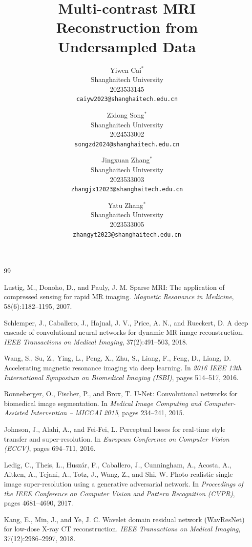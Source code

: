 \documentclass[10pt,twocolumn,letterpaper,bold]{article}
\title{Multi-contrast MRI Reconstruction from Undersampled Data}
\author{
    Yiwen Cai$^*$ \\
    Shanghaitech University \\
    2023533145 \\
    {\tt\small caiyw2023@shanghaitech.edu.cn}
    \and
    Zidong Song$^*$ \\
    Shanghaitech University \\
    2024533002 \\
    {\tt\small songzd2024@shanghaitech.edu.cn}
    \and %
    Jingxuan Zhang$^*$ \\
    Shanghaitech University \\
    2023533003 \\
    {\tt\small zhangjx12023@shanghaitech.edu.cn}
    \and
    Yatu Zhang$^*$ \\
    Shanghaitech University \\
    2023533005 \\
    {\tt\small zhangyt2023@shanghaitech.edu.cn}
}
\begin{document}
\maketitle
\def\thefootnote{*}








\begin{thebibliography}{99}

Lustig, M., Donoho, D., and Pauly, J. M.
\newblock Sparse MRI: The application of compressed sensing for rapid MR imaging.
\newblock \emph{Magnetic Resonance in Medicine}, 58(6):1182--1195, 2007.

Schlemper, J., Caballero, J., Hajnal, J. V., Price, A. N., and Rueckert, D.
\newblock A deep cascade of convolutional neural networks for dynamic MR image reconstruction.
\newblock \emph{IEEE Transactions on Medical Imaging}, 37(2):491--503, 2018.

Wang, S., Su, Z., Ying, L., Peng, X., Zhu, S., Liang, F., Feng, D., Liang, D.
\newblock Accelerating magnetic resonance imaging via deep learning.
\newblock In \emph{2016 IEEE 13th International Symposium on Biomedical Imaging (ISBI)}, pages 514--517, 2016.

Ronneberger, O., Fischer, P., and Brox, T.
\newblock U-Net: Convolutional networks for biomedical image segmentation.
\newblock In \emph{Medical Image Computing and Computer-Assisted Intervention -- MICCAI 2015}, pages 234--241, 2015.

Johnson, J., Alahi, A., and Fei-Fei, L.
\newblock Perceptual losses for real-time style transfer and super-resolution.
\newblock In \emph{European Conference on Computer Vision (ECCV)}, pages 694--711, 2016.

Ledig, C., Theis, L., Husz{\'a}r, F., Caballero, J., Cunningham, A., Acosta, A., Aitken, A., Tejani, A., Totz, J., Wang, Z., and Shi, W.
\newblock Photo-realistic single image super-resolution using a generative adversarial network.
\newblock In \emph{Proceedings of the IEEE Conference on Computer Vision and Pattern Recognition (CVPR)}, pages 4681--4690, 2017.

Kang, E., Min, J., and Ye, J. C.
\newblock Wavelet domain residual network (WavResNet) for low-dose X-ray CT reconstruction.
\newblock \emph{IEEE Transactions on Medical Imaging}, 37(12):2986--2997, 2018.


\end{thebibliography}
\end{document}
